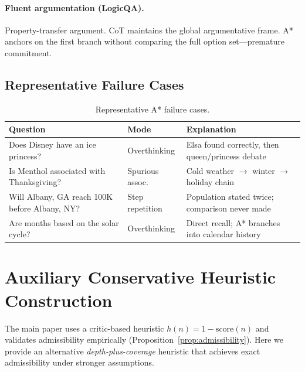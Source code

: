 \documentclass{article}
\begin{document}
\paragraph{Fluent argumentation (LogicQA).}
Property-transfer argument.  CoT maintains the global argumentative frame.
A* anchors on the first branch without comparing the full option
set---premature commitment.

\subsection{Representative Failure Cases}

\begin{table}[h]
\centering
\caption{Representative A* failure cases.}
\label{tab:failure_cases}
\small
\begin{tabular}{@{}p{5cm}lp{5cm}@{}}
\toprule
\textbf{Question} & \textbf{Mode} & \textbf{Explanation} \\
\midrule
Does Disney have an ice princess? & Overthinking
  & Elsa found correctly, then queen/princess debate \\
Is Menthol associated with Thanksgiving? & Spurious assoc.
  & Cold weather $\rightarrow$ winter $\rightarrow$ holiday chain \\
Will Albany, GA reach 100K before Albany, NY? & Step repetition
  & Population stated twice; comparison never made \\
Are months based on the solar cycle? & Overthinking
  & Direct recall; A* branches into calendar history \\
\bottomrule
\end{tabular}
\end{table}

\section{Auxiliary Conservative Heuristic Construction}
\label{app:heuristic_proof}

The main paper uses a critic-based heuristic $h(n) = 1 - \mathrm{score}(n)$
and validates admissibility empirically (Proposition~\ref{prop:admissibility}).
Here we provide an alternative \emph{depth-plus-coverage} heuristic that
achieves exact admissibility under stronger assumptions.
\end{document}
